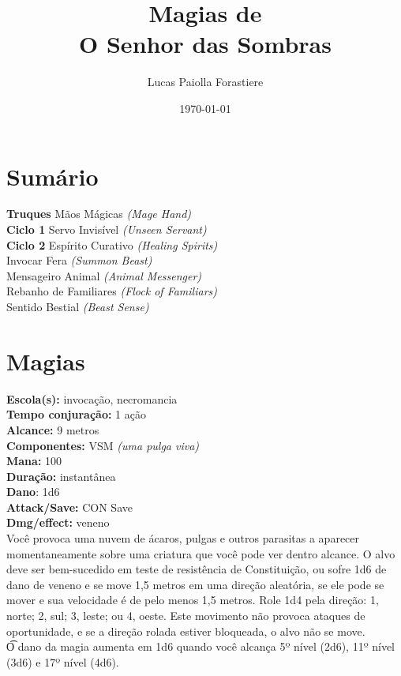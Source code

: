 \documentclass{RPG_Adventure}[2021/10/20]
\title{Magias de\\ \Huge{O Senhor das Sombras}}
\date{\today}
\author{Lucas Paiolla Forastiere}
\begin{document}
\maketitle

\chapter{Sumário}\n\n\noindent\textbf{Truques}
{\normalsize Mãos Mágicas \textit{(Mage Hand)}\\ }
\jump\noindent\textbf{Ciclo 1}
{\normalsize Servo Invisível \textit{(Unseen Servant)}\\ }
\jump\noindent\textbf{Ciclo 2}
{\normalsize Espírito Curativo \textit{(Healing Spirits)}\\ }
{\normalsize Invocar Fera \textit{(Summon Beast)}\\ }
{\normalsize Mensageiro Animal \textit{(Animal Messenger)}\\ }
{\normalsize Rebanho de Familiares \textit{(Flock of Familiars)}\\ }
{\normalsize Sentido Bestial \textit{(Beast Sense)}\\ }
\jump\chapter{Magias}\n\n{}
{\small \t \textbf{Escola(s):} invocação, necromancia\\\t \textbf{Tempo conjuração:} 1 ação\\\t \textbf{Alcance:} 9 metros\\\t \textbf{Componentes:} VSM \textit{(uma pulga viva)}\\\t \textbf{Mana:} 100\\\t \textbf{Duração:} instantânea\\\t \textbf{Dano}: 1d6\\\t \textbf{Attack/Save:} CON Save\\\t \textbf{Dmg/effect:} veneno\\}
{\normalsize Você provoca uma nuvem de ácaros, pulgas e outros parasitas a aparecer momentaneamente sobre uma criatura que você pode ver dentro alcance. O alvo deve ser bem-sucedido em teste de resistência de  Constituição, ou sofre 1d6 de dano de veneno e se move 1,5 metros em uma direção aleatória, se ele pode se mover e sua velocidade é de pelo menos 1,5 metros. Role 1d4 pela direção: 1, norte; 2, sul; 3, leste; ou 4, oeste. Este movimento não provoca ataques de oportunidade, e se a direção rolada estiver bloqueada, o alvo não se move.\\\t O dano da magia aumenta em 1d6 quando você alcança 5º nível (2d6), 11º nível (3d6) e 17º nível (4d6).\\}
\end{document}
